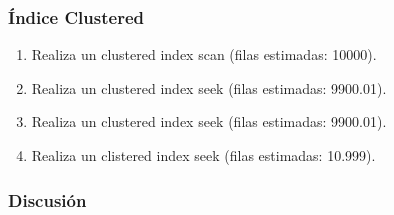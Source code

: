 \subsubsection{Índice Clustered}
\begin{enumerate}[label=(\alph*)]
  \item Realiza un clustered index scan (filas estimadas: 10000).
  \item Realiza un clustered index seek (filas estimadas: 9900.01).
  \item Realiza un clustered index seek (filas estimadas: 9900.01).
  \item Realiza un clistered index seek (filas estimadas: 10.999).
\end{enumerate}

\subsubsection{Discusión}
